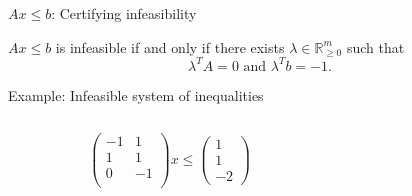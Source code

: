   
\begin{frame}{$Ax ≤b$: Certifying infeasibility}

    
        \begin{theorem}
          
          $Ax ≤b$  is infeasible if and only if there exists  $λ ∈ ℝ^m_{≥0}$ such that 
  \begin{displaymath}
    λ^T A = 0 \text{ and } λ^T b = -1.
  \end{displaymath}
\end{theorem}
        
    
  \end{frame}  
   
\begin{frame}{Example: Infeasible system of inequalities}

    \begin{columns}
      \begin{column}{.5\textwidth}

        \begin{displaymath}
          \begin{pmatrix}
            -1 & 1 \\
            1 & 1 \\
            0 & -1 \\ 
          \end{pmatrix} x ≤
          \begin{pmatrix}
            1 \\ 1 \\ -2
          \end{pmatrix}          
        \end{displaymath}        
      \end{column}
      \begin{column}{.5\textwidth}

      \end{column}       
    \end{columns}
  \end{frame}  

  
\begin{frame}{}

    \begin{columns}
      \begin{column}{.5\textwidth}

      \end{column}
      \begin{column}{.5\textwidth}

      \end{column}       
    \end{columns}
  \end{frame}  
   





